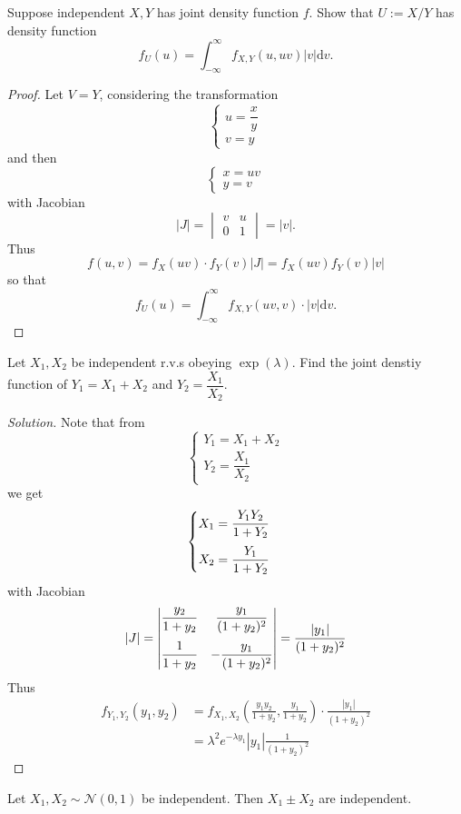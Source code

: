 \documentclass[11pt,singlecolumn, openany, citestyle=authoryear]{elegantbook}
\begin{document}
\begin{CJK}{UTF8}{gbsn}
\begin{example}
    Suppose independent $X,Y$ has joint density function $f$. Show that $U:=X/Y$ has density 
    function 
    $$
    f_U(u) = \int_{-\infty}^\infty f_{X,Y}(u,uv)|v|\mathrm{d}v.
    $$
\end{example}
\begin{proof}
    Let $V=Y$, considering the transformation
    $$
    \begin{cases}
        u=\dfrac{x}{y}\\
        v=y
    \end{cases}
    $$
    and then 
    $$
    \begin{cases}
        x=uv\\
        y=v
    \end{cases}
    $$
    with Jacobian 
    $$
    |J|=
    \begin{vmatrix}
        v & u \\
        0 & 1
    \end{vmatrix}=
    |v|.
    $$
    Thus 
    $$
    f(u,v)=f_X(uv)\cdot f_Y(v) |J| = f_X(uv)f_Y(v)|v|
    $$
    so that 
    $$
    f_U(u)=\int_{-\infty}^\infty f_{X,Y}(uv,v)\cdot|v|\mathrm{d}v.
    $$
\end{proof}

\begin{example}
    Let $X_1,X_2$ be independent r.v.s obeying $\operatorname*{exp}(\lambda)$. Find the 
    joint denstiy function of $Y_1 = X_1 + X_2$ and $Y_2 = \dfrac{X_1}{X_2}$.
\end{example}
\begin{proof}[Solution]
    Note that from  
    $$
    \begin{cases}
        Y_1 = X_1+X_2\\
        Y_2 = \dfrac{X_1}{X_2}
    \end{cases}
    $$
    we get 
    $$
    \begin{cases}
        \vspace{1.5ex}
        X_1 = \dfrac{Y_1Y_2}{1+Y_2}\\
        X_2 = \dfrac{Y_1}{1+Y_2}
    \end{cases}
    $$
    with Jacobian 
    $$
    |J| = 
    \begin{vmatrix}
        \vspace{1.5ex}
        \dfrac{y_2}{1+y_2}& \dfrac{y_1}{(1+y_2)^2}\\
        \dfrac{1}{1+y_2}& -\dfrac{y_1}{(1+y_2)^2}
    \end{vmatrix}=
    \frac{|y_1|}{(1+y_2)^2}
    $$
    Thus 
    \begin{align*}
        f_{Y_1,Y_2}(y_1,y_2)&=
        f_{X_1,X_2}\left(\frac{y_1y_2}{1+y_2},\frac{y_1}{1+y_2}\right)\cdot 
        \frac{|y_1|}{(1+y_2)^2}\\
        &=\lambda^2 e^{-\lambda y_1}|y_1|\frac{1}{(1+y_2)^2}
    \end{align*}
\end{proof}
\begin{example}
    Let $X_1,X_2\sim \mathcal{N}(0,1)$ be independent. Then $X_1\pm X_2$ are independent. 
\end{example}


\end{CJK}
\end{document}

